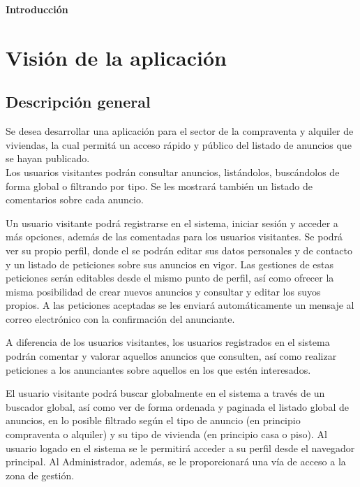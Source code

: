 \newpage{\pagestyle{empty}\cleardoublepage}
\newpage{\pagestyle{empty}\cleardoublepage}
\newpage
\vspace*{\fill}
    \begin{center}
      \thispagestyle{empty} \vspace*{0cm} \textbf{\huge
Introducci\'{o}n}
    \end{center}
    \vspace*{\fill}
\newpage{\pagestyle{empty}\cleardoublepage}
\chapter{Visi\'{o}n de la aplicaci\'{o}n}
\section{Descripci\'{o}n general}


Se desea desarrollar una aplicaci\'{o}n para el sector de la compraventa y alquiler de viviendas, la cual permit\'{a} un acceso r\'{a}pido y p\'{u}blico del listado de anuncios que se hayan publicado. \\

Los usuarios visitantes podr\'{a}n consultar anuncios, list\'{a}ndolos, busc\'{a}ndolos de forma global o filtrando por tipo. Se les mostrar\'{a} tambi\'{e}n un listado de comentarios sobre cada anuncio.

Un usuario visitante podr\'{a} registrarse en el sistema, iniciar sesi\'{o}n y acceder a m\'{a}s opciones, adem\'{a}s de las comentadas para los usuarios visitantes. Se podr\'{a} ver su propio perfil, donde el se podr\'{a}n editar sus datos personales y de contacto y un listado de peticiones sobre sus anuncios en vigor. Las gestiones de estas peticiones ser\'{a}n editables desde el mismo punto de perfil, as\'{i} como ofrecer la misma posibilidad de crear nuevos anuncios y consultar y editar los suyos propios. A las peticiones aceptadas se les enviará autom\'{a}ticamente un mensaje al correo electr\'{o}nico con la confirmaci\'{o}n del anunciante.

A diferencia de los usuarios visitantes, los usuarios registrados en el sistema podr\'{a}n comentar y valorar aquellos anuncios que consulten, as\'{i} como realizar peticiones a los anunciantes sobre aquellos en los que est\'{e}n interesados.





El usuario visitante podr\'{a} buscar globalmente en el sistema a trav\'{e}s de un buscador global, as\'{i} como ver de forma ordenada y paginada el listado global de anuncios, en lo posible filtrado seg\'{u}n el tipo de anuncio (en principio compraventa o alquiler) y su tipo de vivienda (en principio casa o piso). Al usuario logado en el sistema se le permitir\'{a} acceder a su perfil desde el navegador principal. Al Administrador, adem\'{a}s, se le proporcionar\'{a} una v\'{i}a de acceso a la zona de gesti\'{o}n.


